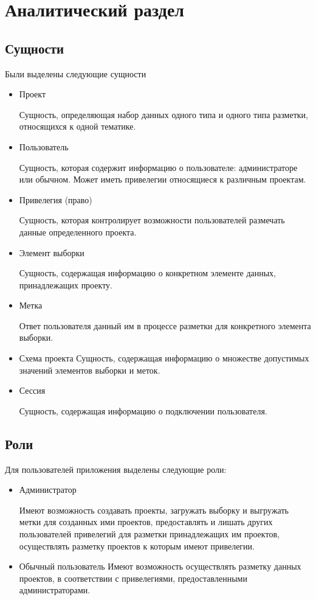 \section{Аналитический раздел}

\subsection{Сущности}
Были выделены следующие сущности

\begin{itemize}

\item Проект

Сущность, определяющая набор данных одного типа и одного типа разметки, относящихся к одной тематике.

\item Пользователь

Сущность, которая содержит информацию о пользователе: администраторе или обычном.
Может иметь привелегии относящиеся к различным проектам.

\item Привелегия (право)

Сущность, которая контролирует возможности пользователей 
размечать данные определенного проекта.

\item Элемент выборки

Сущность, содержащая информацию о конкретном элементе данных, принадлежащих проекту.

\item Метка

Ответ пользователя данный им в процессе разметки для конкретного элемента выборки.

\item Схема проекта
Сущность, содержащая информацию о множестве допустимых значений элементов выборки и меток.

\item Сессия

Сущность, содержащая информацию о подключении пользователя.

\end{itemize}

\subsection{Роли}
Для пользователей приложения выделены следующие роли:

\begin{itemize}
\item Администратор

Имеют возможность создавать проекты, загружать выборку и выгружать метки для созданных ими проектов, предоставлять и лишать
других пользователей привелегий для разметки принадлежащих им проектов, осуществлять разметку проектов к которым имеют привелегии.

\item Обычный пользователь 
Имеют возможность осуществлять разметку данных проектов, в соответствии с привелегиями, предоставленными администраторами. 

\end{itemize}


